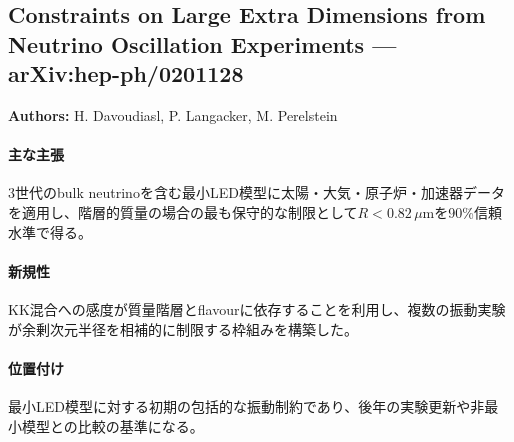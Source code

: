 \subsection{Constraints on Large Extra Dimensions from Neutrino Oscillation Experiments --- arXiv:hep-ph/0201128}

\textbf{Authors:} H. Davoudiasl, P. Langacker, M. Perelstein

\paragraph{主な主張}
3世代のbulk neutrinoを含む最小LED模型に太陽・大気・原子炉・加速器データを適用し、階層的質量の場合の最も保守的な制限として$R<0.82\,\mu\mathrm{m}$を90\%信頼水準で得る\cite{Davoudiasl:2002LEDConstraints}。

\paragraph{新規性}
KK混合への感度が質量階層とflavourに依存することを利用し、複数の振動実験が余剰次元半径を相補的に制限する枠組みを構築した。

\paragraph{位置付け}
最小LED模型に対する初期の包括的な振動制約であり、後年の実験更新や非最小模型との比較の基準になる。

